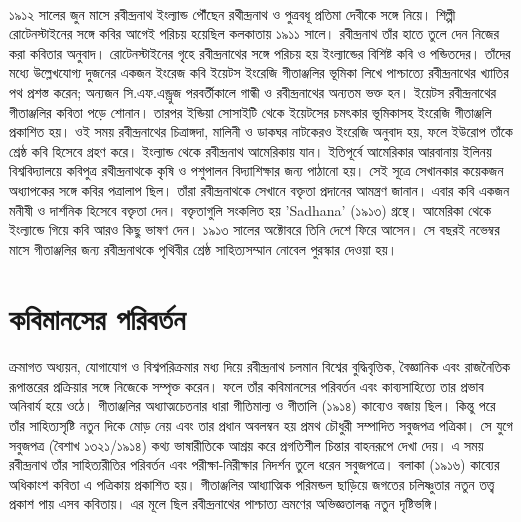 \documentclass{article}
\begin{document}
\paragraph{}
১৯১২ সালের জুন মাসে রবীন্দ্রনাথ ইংল্যান্ড পৌঁছেন রথীন্দ্রনাথ ও পুত্রবধূ প্রতিমা দেবীকে সঙ্গে নিয়ে। শিল্পী রোটেনস্টাইনের সঙ্গে কবির আগেই পরিচয় হয়েছিল কলকাতায় ১৯১১ সালে। রবীন্দ্রনাথ তাঁর হাতে তুলে দেন নিজের করা কবিতার অনুবাদ। রোটেনস্টাইনের গৃহে রবীন্দ্রনাথের সঙ্গে পরিচয় হয় ইংল্যান্ডের বিশিষ্ট কবি ও পন্ডিতদের। তাঁদের মধ্যে উল্লেখযোগ্য দুজনের একজন ইংরেজ কবি ইয়েটস ইংরেজি গীতাঞ্জলির ভূমিকা লিখে পাশ্চাত্যে রবীন্দ্রনাথের খ্যাতির পথ প্রশস্ত করেন; অন্যজন সি.এফ.এন্ড্রুজ পরবর্তীকালে গান্ধী ও রবীন্দ্রনাথের অন্যতম ভক্ত হন। ইয়েটস রবীন্দ্রনাথের গীতাঞ্জলির কবিতা পড়ে শোনান। তারপর ইন্ডিয়া সোসাইটি থেকে ইয়েটসের চমৎকার ভূমিকাসহ ইংরেজি গীতাঞ্জলি  প্রকাশিত হয়। ওই সময় রবীন্দ্রনাথের চিত্রাঙ্গদা, মালিনী ও ডাকঘর নাটকেরও ইংরেজি অনুবাদ হয়, ফলে ইউরোপ তাঁকে শ্রেষ্ঠ কবি হিসেবে গ্রহণ করে। ইংল্যান্ড থেকে রবীন্দ্রনাথ আমেরিকায় যান। ইতিপূর্বে আমেরিকার আরবানায় ইলিনয় বিশ্ববিদ্যালয়ে কবিপুত্র রথীন্দ্রনাথকে কৃষি ও পশুপালন বিদ্যাশিক্ষার জন্য পাঠানো হয়। সেই সূত্রে সেখানকার কয়েকজন অধ্যাপকের সঙ্গে কবির পত্রালাপ ছিল। তাঁরা রবীন্দ্রনাথকে সেখানে বক্তৃতা প্রদানের আমন্ত্রণ জানান। এবার কবি একজন মনীষী ও দার্শনিক হিসেবে বক্তৃতা দেন। বক্তৃতাগুলি সংকলিত হয় 'Sadhana' (১৯১৩) গ্রন্থে। আমেরিকা থেকে ইংল্যান্ডে গিয়ে কবি আরও কিছু ভাষণ দেন। ১৯১৩ সালের অক্টোবরে তিনি দেশে ফিরে আসেন। সে বছরই নভেম্বর মাসে গীতাঞ্জলির  জন্য রবীন্দ্রনাথকে পৃথিবীর শ্রেষ্ঠ সাহিত্যসম্মান নোবেল পুরস্কার দেওয়া হয়।

\section{কবিমানসের পরিবর্তন}
\paragraph{}
ক্রমাগত অধ্যয়ন, যোগাযোগ ও বিশ্বপরিক্রমার মধ্য দিয়ে রবীন্দ্রনাথ চলমান বিশ্বের বুদ্ধিবৃত্তিক, বৈজ্ঞানিক এবং রাজনৈতিক রূপান্তরের প্রক্রিয়ার সঙ্গে নিজেকে সম্পৃক্ত করেন। ফলে তাঁর কবিমানসের পরিবর্তন এবং কাব্যসাহিত্যে তার প্রভাব অনিবার্য হয়ে ওঠে। গীতাঞ্জলির অধ্যাত্মচেতনার ধারা গীতিমাল্য ও গীতালি (১৯১৪) কাব্যেও বজায় ছিল। কিন্তু পরে তাঁর সাহিত্যসৃষ্টি নতুন দিকে মোড় নেয় এবং তার প্রধান অবলম্বন হয়  প্রমথ চৌধুরী সম্পাদিত  সবুজপত্র পত্রিকা। সে যুগে সবুজপত্র (বৈশাখ ১৩২১/১৯১৪) কথ্য ভাষারীতিকে আশ্রয় করে প্রগতিশীল চিন্তার বাহনরূপে দেখা দেয়। এ সময় রবীন্দ্রনাথ তাঁর সাহিত্যরীতির পরিবর্তন এবং পরীক্ষা-নিরীক্ষার নিদর্শন তুলে ধরেন সবুজপত্রে। বলাকা (১৯১৬) কাব্যের অধিকাংশ কবিতা এ পত্রিকায় প্রকাশিত হয়। গীতাঞ্জলির আধ্যাত্মিক পরিমন্ডল ছাড়িয়ে জগতের চলিষ্ণুতার নতুন তত্ত্ব প্রকাশ পায় এসব কবিতায়। এর মূলে ছিল রবীন্দ্রনাথের পাশ্চাত্য ভ্রমণের অভিজ্ঞতালব্ধ নতুন দৃষ্টিভঙ্গি।
\end{document}
